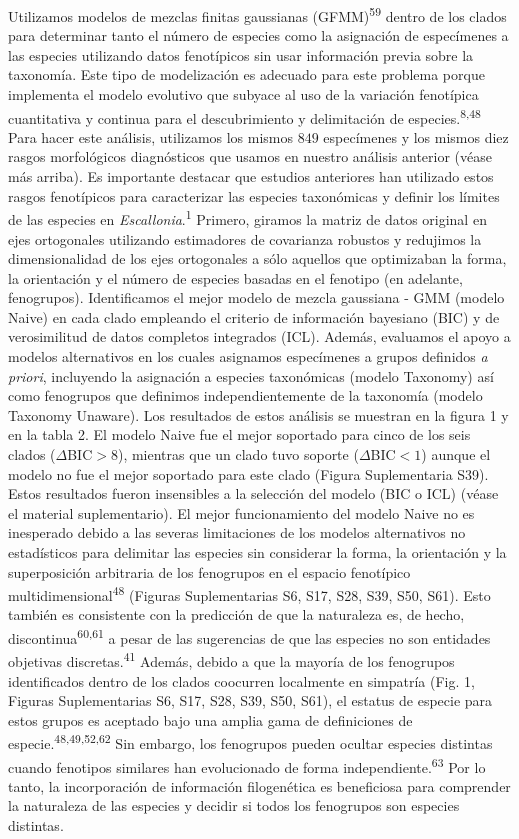 \documentclass[
  11pt,
]{article}
\begin{document}
Utilizamos modelos de mezclas finitas gaussianas (GFMM)\textsuperscript{59} dentro de los clados para determinar tanto el número de especies como la asignación de especímenes a las especies utilizando datos fenotípicos sin usar información previa sobre la taxonomía. Este tipo de modelización es adecuado para este problema porque implementa el modelo evolutivo que subyace al uso de la variación fenotípica cuantitativa y continua para el descubrimiento y delimitación de especies.\textsuperscript{8,48} Para hacer este análisis, utilizamos los mismos \(849\) especímenes y los mismos diez rasgos morfológicos diagnósticos que usamos en nuestro análisis anterior (véase más arriba). Es importante destacar que estudios anteriores han utilizado estos rasgos fenotípicos para caracterizar las especies taxonómicas y definir los límites de las especies en \emph{Escallonia}.\textsuperscript{1} Primero, giramos la matriz de datos original en ejes ortogonales utilizando estimadores de covarianza robustos y redujimos la dimensionalidad de los ejes ortogonales a sólo aquellos que optimizaban la forma, la orientación y el número de especies basadas en el fenotipo (en adelante, fenogrupos). Identificamos el mejor modelo de mezcla gaussiana - GMM (modelo Naive) en cada clado empleando el criterio de información bayesiano (BIC) y de verosimilitud de datos completos integrados (ICL). Además, evaluamos el apoyo a modelos alternativos en los cuales asignamos especímenes a grupos definidos \emph{a priori}, incluyendo la asignación a especies taxonómicas (modelo Taxonomy) así como fenogrupos que definimos independientemente de la taxonomía (modelo Taxonomy Unaware). Los resultados de estos análisis se muestran en la figura 1 y en la tabla 2. El modelo Naive fue el mejor soportado para cinco de los seis clados (\(\Delta\)BIC\(>8\)), mientras que un clado tuvo soporte (\(\Delta\)BIC\(<1\)) aunque el modelo no fue el mejor soportado para este clado (Figura Suplementaria S39). Estos resultados fueron insensibles a la selección del modelo (BIC o ICL) (véase el material suplementario). El mejor funcionamiento del modelo Naive no es inesperado debido a las severas limitaciones de los modelos alternativos no estadísticos para delimitar las especies sin considerar la forma, la orientación y la superposición arbitraria de los fenogrupos en el espacio fenotípico multidimensional\textsuperscript{48} (Figuras Suplementarias S6, S17, S28, S39, S50, S61). Esto también es consistente con la predicción de que la naturaleza es, de hecho, discontinua\textsuperscript{60,61} a pesar de las sugerencias de que las especies no son entidades objetivas discretas.\textsuperscript{41} Además, debido a que la mayoría de los fenogrupos identificados dentro de los clados coocurren localmente en simpatría (Fig. 1, Figuras Suplementarias S6, S17, S28, S39, S50, S61), el estatus de especie para estos grupos es aceptado bajo una amplia gama de definiciones de especie.\textsuperscript{48,49,52,62} Sin embargo, los fenogrupos pueden ocultar especies distintas cuando fenotipos similares han evolucionado de forma independiente.\textsuperscript{63} Por lo tanto, la incorporación de información filogenética es beneficiosa para comprender la naturaleza de las especies y decidir si todos los fenogrupos son especies distintas.
\end{document}
